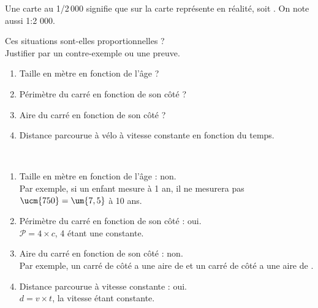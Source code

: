 \begin{exemple*1}
   Une carte au 1/2\,000 signifie que  sur la carte représente  en réalité, soit . On note aussi 1:2 000. \\ [-2mm]
      \vspace*{-4mm}
\end{exemple*1}


\exercicesbase

\begin{colonne*exercice}

\begin{exercice} %
   Ces situations sont-elles proportionnelles ? \\
   Justifier par un contre-exemple ou une preuve.
   \begin{enumerate}
      \item Taille en mètre en fonction de l'âge ?
      \item Périmètre du carré en fonction de son côté ?
      \item Aire du carré en fonction de son côté ?
      \item Distance parcourue à vélo à vitesse constante en fonction du temps.
   \end{enumerate}
\end{exercice}

\begin{corrige}
   \ \\ [-5mm]
   \begin{enumerate}
      \item Taille en mètre en fonction de l'âge : {\blue non}. \\
         Par exemple, si un enfant mesure  à 1 an, il ne mesurera pas $\ucm{750} =\um{7,5}$ à 10 ans.
      \item Périmètre du carré en fonction de son côté : {\blue oui}. \\
         $\mathcal{P} =4\times c$, 4 étant une constante.
      \item Aire du carré en fonction de son côté  : {\blue non}. \\
         Par exemple, un carré de côté  a une aire de  et un carré de côté  a une aire de .
      \item Distance parcourue à vitesse constante : {\blue oui}. \\
         $d =v\times t$, la vitesse étant constante.
   \end{enumerate}
\end{corrige}


\end{colonne*exercice}
